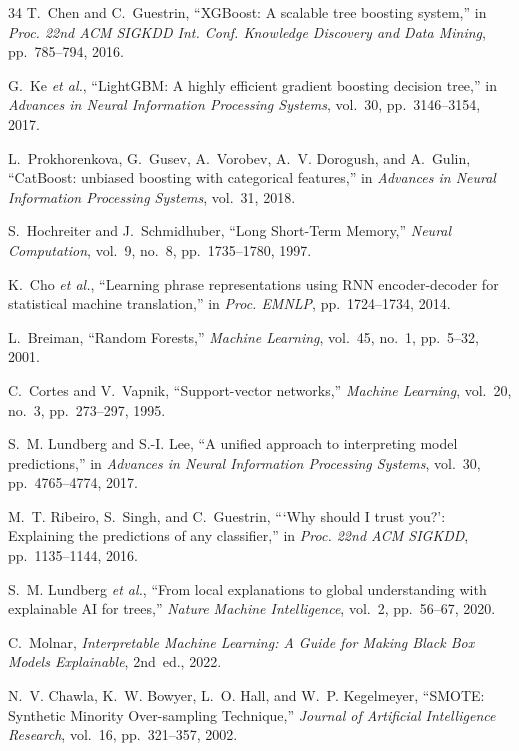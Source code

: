 \documentclass[conference]{IEEEtran}
\begin{document}
\begin{thebibliography}{34}
T.~Chen and C.~Guestrin, ``XGBoost: A scalable tree boosting system,'' in \textit{Proc. 22nd ACM SIGKDD Int. Conf. Knowledge Discovery and Data Mining}, pp.~785--794, 2016.

G.~Ke \textit{et al.}, ``LightGBM: A highly efficient gradient boosting decision tree,'' in \textit{Advances in Neural Information Processing Systems}, vol.~30, pp.~3146--3154, 2017.

L.~Prokhorenkova, G.~Gusev, A.~Vorobev, A.~V. Dorogush, and A.~Gulin, ``CatBoost: unbiased boosting with categorical features,'' in \textit{Advances in Neural Information Processing Systems}, vol.~31, 2018.

S.~Hochreiter and J.~Schmidhuber, ``Long Short-Term Memory,'' \textit{Neural Computation}, vol.~9, no.~8, pp.~1735--1780, 1997.

K.~Cho \textit{et al.}, ``Learning phrase representations using RNN encoder-decoder for statistical machine translation,'' in \textit{Proc. EMNLP}, pp.~1724--1734, 2014.

L.~Breiman, ``Random Forests,'' \textit{Machine Learning}, vol.~45, no.~1, pp.~5--32, 2001.

C.~Cortes and V.~Vapnik, ``Support-vector networks,'' \textit{Machine Learning}, vol.~20, no.~3, pp.~273--297, 1995.

S.~M. Lundberg and S.-I. Lee, ``A unified approach to interpreting model predictions,'' in \textit{Advances in Neural Information Processing Systems}, vol.~30, pp.~4765--4774, 2017.

M.~T. Ribeiro, S.~Singh, and C.~Guestrin, ```Why should I trust you?': Explaining the predictions of any classifier,'' in \textit{Proc. 22nd ACM SIGKDD}, pp.~1135--1144, 2016.

S.~M. Lundberg \textit{et al.}, ``From local explanations to global understanding with explainable AI for trees,'' \textit{Nature Machine Intelligence}, vol.~2, pp.~56--67, 2020.

C.~Molnar, \textit{Interpretable Machine Learning: A Guide for Making Black Box Models Explainable}, 2nd~ed., 2022.

N.~V. Chawla, K.~W. Bowyer, L.~O. Hall, and W.~P. Kegelmeyer, ``SMOTE: Synthetic Minority Over-sampling Technique,'' \textit{Journal of Artificial Intelligence Research}, vol.~16, pp.~321--357, 2002.


\end{thebibliography}
\end{document}
